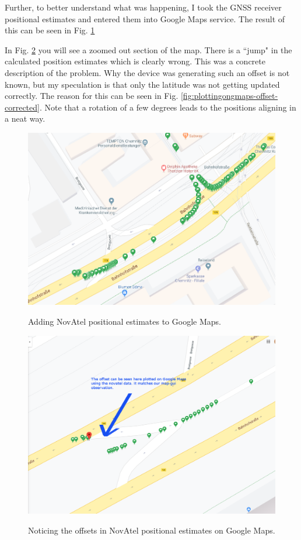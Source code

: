 \documentclass[a4paper, 12pt, oneside]{report}
\begin{document}
  Further, to better understand what was happening, I took the GNSS receiver positional estimates and entered them into Google Maps service. The result of this can be seen in Fig. \ref{fig:plottingongmaps}
  
  In Fig. \ref{fig:plottingongmaps-offset} you will see a zoomed out section of the map. There is a ``jump" in the calculated position estimates which is clearly wrong. This was a concrete description of the problem. Why the device was generating such an offset is not known, but my speculation is that only the latitude was not getting updated correctly. The reason for this can be seen in Fig. \ref{fig:plottingongmaps-offset-corrected}. Note that a rotation of a few degrees leads to the positions aligning in a neat way.
  
 
  \begin{figure}[h]
      \caption{Adding NovAtel positional estimates to Google Maps.}
      \centering
      \includegraphics[width=1\textwidth]{plottingnovateldataongooglemap}
      \label{fig:plottingongmaps}
  \end{figure}

 \begin{figure}[h]
      \caption{Noticing the offsets in NovAtel positional estimates on Google Maps.}
      \centering
      \includegraphics[width=1\textwidth]{offsetinmap}
      \label{fig:plottingongmaps-offset}
  \end{figure}
\end{document}

